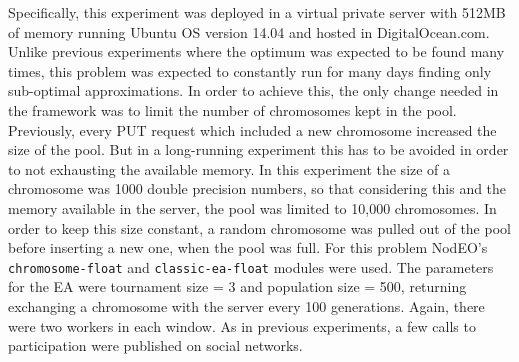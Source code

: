 \documentclass{sig-alternate}
\begin{document}
Specifically, this experiment was deployed in a virtual private server with 512MB of memory
running Ubuntu OS version 14.04 and hosted in DigitalOcean.com. Unlike previous
experiments where the optimum was expected to be found many times, 
this problem was expected to constantly run for many days finding only
sub-optimal approximations. In order to achieve this, the only change needed 
in the framework was to limit the number of chromosomes kept in the pool. 
Previously, every PUT request which included a new chromosome increased 
the size of the pool. But in a long-running experiment this has to be avoided
in order to not exhausting the available memory. In this experiment the size
of a chromosome was 1000 double precision numbers, so that considering this
and the memory available in the server, the pool was limited 
to 10,000 chromosomes.  In order to keep this size
constant, a random chromosome was pulled out of the pool before inserting a
new one, when the pool was full. For this problem {\sf NodEO}'s {\tt chromosome-float} 
and {\tt classic-ea-float} modules were used. The parameters for the EA 
were tournament size = 3 and  population size = 500, returning exchanging a
chromosome with the server every 100 generations. Again, there were two workers in each window.
As in previous experiments, a few calls to participation were published on social networks.
\end{document}
